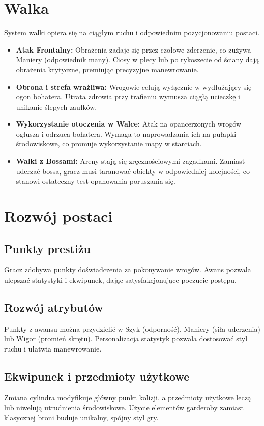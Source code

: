 \documentclass[12pt, letterpaper,Titlepage]{article}
\begin{document}
\section{Walka}
System walki opiera się na ciągłym ruchu i odpowiednim pozycjonowaniu postaci.

\begin{itemize}
\item \textbf{Atak Frontalny:} Obrażenia zadaje się przez czołowe zderzenie, co zużywa Maniery (odpowiednik many). Ciosy w plecy lub po rykoszecie od ściany dają obrażenia krytyczne, premiując precyzyjne manewrowanie.
\item \textbf{Obrona i strefa wrażliwa:} Wrogowie celują wyłącznie w wydłużający się ogon bohatera. Utrata zdrowia przy trafieniu wymusza ciągłą ucieczkę i unikanie ślepych zaułków.
\item \textbf{Wykorzystanie otoczenia w Walce:} Atak na opancerzonych wrogów ogłusza i odrzuca bohatera. Wymaga to naprowadzania ich na pułapki środowiskowe, co promuje wykorzystanie mapy w starciach.
\item \textbf{Walki z Bossami:} Areny stają się zręcznościowymi zagadkami. Zamiast uderzać bossa, gracz musi taranować obiekty w odpowiedniej kolejności, co stanowi ostateczny test opanowania poruszania się.
\end{itemize}

\vspace{1 cm}

\section{Rozwój postaci}

\subsection{Punkty prestiżu}
Gracz zdobywa punkty doświadczenia za pokonywanie wrogów. Awans pozwala ulepszać statystyki i ekwipunek, dając satysfakcjonujące poczucie postępu.

\subsection{Rozwój atrybutów}
Punkty z awansu można przydzielić w Szyk (odporność), Maniery (siła uderzenia) lub Wigor (promień skrętu). Personalizacja statystyk pozwala dostosować styl ruchu i ułatwia manewrowanie.

\subsection{Ekwipunek i przedmioty użytkowe}
Zmiana cylindra modyfikuje główny punkt kolizji, a przedmioty użytkowe leczą lub niwelują utrudnienia środowiskowe. Użycie elementów garderoby zamiast klasycznej broni buduje unikalny, spójny styl gry.
\end{document}
